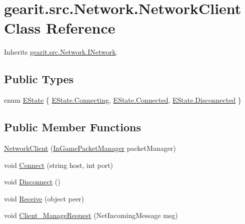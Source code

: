 \hypertarget{classgearit_1_1src_1_1_network_1_1_network_client}{\section{gearit.\+src.\+Network.\+Network\+Client Class Reference}
\label{classgearit_1_1src_1_1_network_1_1_network_client}
}


Inherits \hyperlink{classgearit_1_1src_1_1_network_1_1_i_network}{gearit.\+src.\+Network.\+I\+Network}.

\subsection*{Public Types}
\begin{DoxyCompactItemize}
\item 
enum \hyperlink{classgearit_1_1src_1_1_network_1_1_network_client_a8c5d63a28969b69f509466b1e2138aee}{E\+State} \{ \hyperlink{classgearit_1_1src_1_1_network_1_1_network_client_a8c5d63a28969b69f509466b1e2138aeeae321c53b354930ba96f0243e652df458}{E\+State.\+Connecting}, 
\hyperlink{classgearit_1_1src_1_1_network_1_1_network_client_a8c5d63a28969b69f509466b1e2138aeea2ec0d16e4ca169baedb9b2d50ec5c6d7}{E\+State.\+Connected}, 
\hyperlink{classgearit_1_1src_1_1_network_1_1_network_client_a8c5d63a28969b69f509466b1e2138aeeaef70e46fd3bbc21e3e1f0b6815e750c0}{E\+State.\+Disconnected}
 \}
\end{DoxyCompactItemize}
\subsection*{Public Member Functions}
\begin{DoxyCompactItemize}
\item 
\hyperlink{classgearit_1_1src_1_1_network_1_1_network_client_a70548a9748e4545628f87ffb4ed500b8}{Network\+Client} (\hyperlink{classgearit_1_1src_1_1_network_1_1_in_game_packet_manager}{In\+Game\+Packet\+Manager} packet\+Manager)
\item 
void \hyperlink{classgearit_1_1src_1_1_network_1_1_network_client_afcc11cbd1fd2d786b116c2d1d30f59b8}{Connect} (string host, int port)
\item 
void \hyperlink{classgearit_1_1src_1_1_network_1_1_network_client_a74a0f4fec48f511889a274c0055439e2}{Disconnect} ()
\item 
void \hyperlink{classgearit_1_1src_1_1_network_1_1_network_client_a9277f91c13b8af94e4fc8ff694c6a921}{Receive} (object peer)
\item 
void \hyperlink{classgearit_1_1src_1_1_network_1_1_network_client_aaec0a47a10708def5d2f1bd3394381d9}{Client\+\_\+\+Manage\+Request} (Net\+Incoming\+Message msg)
\end{DoxyCompactItemize}
